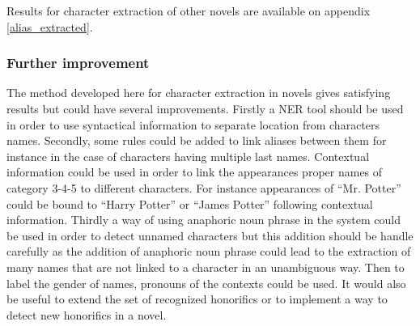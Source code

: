 \documentclass[a4paper, 12pt]{report}
\begin{document}
Results for character extraction of other novels are available on appendix \ref{alias_extracted}. \\

\subsubsection{Further improvement}
The method developed here for character extraction in novels gives satisfying results but could have several improvements.
Firstly a NER tool should be used in order to use syntactical information to separate location from characters names.
Secondly, some rules could be added to link aliases between them for instance in the case of characters having multiple last names.
Contextual information could be used in order to link the appearances proper names of category 3-4-5 to different characters.
For instance appearances of ``Mr. Potter'' could be bound to ``Harry Potter'' or ``James Potter'' following contextual information.
Thirdly a way of using anaphoric noun phrase in the system could be used in order to detect unnamed characters
but this addition should be handle carefully as the addition of anaphoric noun phrase could lead to the extraction of many names that are not linked to a character
in an unambiguous way.
Then to label the gender of names, pronouns of the contexts could be used.
It would also be useful to extend the set of recognized honorifics or to implement a way to detect new honorifics in a novel.\\

\begin{table}
\center
{}
\caption{Speaker annotated in the script of the movie Blackkklansman}\label{annotation}
\end{table}
\end{document}
